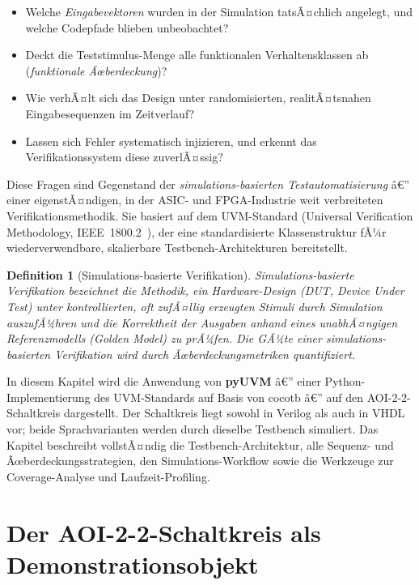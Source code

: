 ﻿\documentclass[12pt,a4paper]{report}
\newtheorem{definition}{Definition}[section]
\begin{document}
\begin{itemize}
    \item Welche \emph{Eingabevektoren} wurden in der Simulation tatsÃ¤chlich
          angelegt, und welche Codepfade blieben unbeobachtet?
    \item Deckt die Teststimulus-Menge alle funktionalen Verhaltensklassen ab
          (\emph{funktionale Ãœberdeckung})?
    \item Wie verhÃ¤lt sich das Design unter randomisierten, realitÃ¤tsnahen
          Eingabesequenzen im Zeitverlauf?
    \item Lassen sich Fehler systematisch injizieren, und erkennt das
          Verifikationssystem diese zuverlÃ¤ssig?
\end{itemize}

Diese Fragen sind Gegenstand der \emph{simulations-basierten Testautomatisierung}
â€” einer eigenstÃ¤ndigen, in der ASIC- und FPGA-Industrie weit verbreiteten
Verifikationsmethodik. Sie basiert auf dem UVM-Standard (Universal Verification
Methodology, IEEE~1800.2~\cite{uvm2020}), der eine standardisierte
Klassenstruktur fÃ¼r wiederverwendbare, skalierbare Testbench-Architekturen
bereitstellt.

\begin{definition}[Simulations-basierte Verifikation]
Simulations-basierte Verifikation bezeichnet die Methodik, ein
Hardware-Design (DUT, \emph{Device Under Test}) unter kontrollierten,
oft zufÃ¤llig erzeugten Stimuli durch Simulation auszufÃ¼hren und die
Korrektheit der Ausgaben anhand eines unabhÃ¤ngigen Referenzmodells (\emph{Golden
Model}) zu prÃ¼fen. Die GÃ¼te einer simulations-basierten Verifikation wird durch
\emph{Ãœberdeckungsmetriken} quantifiziert.
\end{definition}

In diesem Kapitel wird die Anwendung von \textbf{pyUVM} \cite{pyuvm2024} â€” einer
Python-Implemen\-tierung des UVM-Standards auf Basis von cocotb \cite{cocotb2024}
â€” auf den AOI-2-2-Schaltkreis dargestellt. Der Schaltkreis liegt sowohl in
Verilog als auch in VHDL vor; beide Sprachvarianten werden durch dieselbe
Testbench simuliert. Das Kapitel beschreibt vollstÃ¤ndig die
Testbench-Architektur, alle Sequenz- und Ãœberdeckungsstrategien, den
Simulations-Workflow sowie die Werkzeuge zur Coverage-Analyse und
Laufzeit-Profiling.

\section{Der AOI-2-2-Schaltkreis als Demonstrationsobjekt}
\label{subsec:aoi_schaltkreis}
\end{document}
